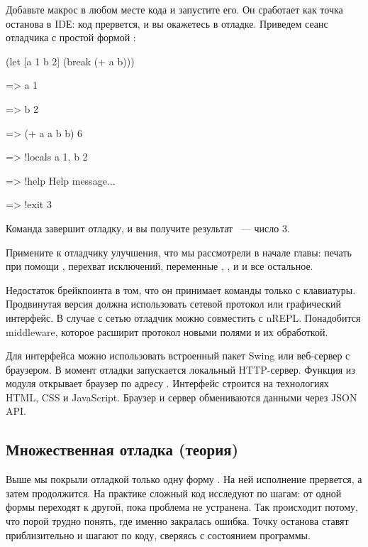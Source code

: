 Добавьте макрос  в любом месте кода и запустите его. Он сработает как точка останова в IDЕ: код прервется, и вы окажетесь в отладке. Приведем сеанс отладчика с простой формой :

\begin{english}
  \begin{clojure}
(let [a 1 b 2]
  (break (+ a b)))

=> a
1

=> b
2

=> (+ a a b b)
6

=> !locals
{a 1, b 2}

=> !help
Help message...

=> !exit
3
  \end{clojure}
\end{english}

Команда  завершит отладку, и вы получите результат ~--- число 3.

Примените к отладчику улучшения, что мы рассмотрели в начале главы: печать при помощи , перехват исключений, переменные , ,  и  и все остальное.

Недостаток брейкпоинта в том, что он принимает команды только с клавиатуры. Продвинутая версия должна использовать сетевой протокол или графический интерфейс. В случае с сетью отладчик можно совместить с nREPL. Понадобится middleware, которое расширит протокол новыми полями и их обработкой.

Для интерфейса можно использовать встроенный пакет Swing или веб-сервер с браузером. В момент отладки запускается локальный HTTP-сервер. Функция  из модуля  открывает браузер по адресу . Интерфейс строится на технологиях HTML, CSS и JavaScript. Браузер и сервер обмениваются данными через JSON API.

\subsection{Множественная отладка (теория)}

Выше мы покрыли отладкой только одну форму . На ней исполнение прервется, а затем продолжится. На практике сложный код исследуют по шагам: от одной формы переходят к другой, пока проблема не устранена. Так происходит потому, что порой трудно понять, где именно закралась ошибка. Точку останова ставят приблизительно и шагают по коду, сверяясь с состоянием программы.

